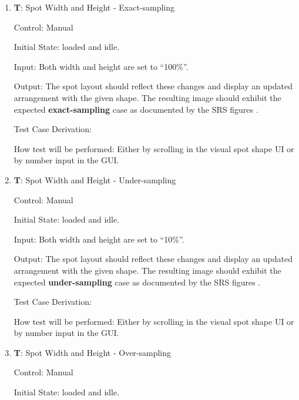 \documentclass[12pt, titlepage]{article}
\newcounter{testnum} %
\begin{document}
\begin{enumerate}

  \item{\textbf{T\thetestnum \label{T_spotSize}}: Spot Width and Height - Exact-sampling\\}

    Control: Manual
              
    Initial State: \progname{} loaded and idle.
              
    Input: Both width and height are set to ``100\%''.
              
    Output: The spot layout should reflect these changes and display an updated arrangement with the given shape.
    The resulting image should exhibit the expected \textbf{exact-sampling} case as documented by the SRS figures \citep{SRS}.

    Test Case Derivation: 
              
    How test will be performed: Either by scrolling in the visual spot shape UI or by number input in the GUI.
					
    \item{\textbf{T\thetestnum \label{T_spotSize10}}: Spot Width and Height - Under-sampling\\}

    Control: Manual
              
    Initial State: \progname{} loaded and idle.
              
    Input: Both width and height are set to ``10\%''.
              
    Output: The spot layout should reflect these changes and display an updated arrangement with the given shape.
    The resulting image should exhibit the expected \textbf{under-sampling} case as documented by the SRS figures \citep{SRS}.

    Test Case Derivation: 
              
    How test will be performed: Either by scrolling in the visual spot shape UI or by number input in the GUI.
					
    \item{\textbf{T\thetestnum \label{T_spotSize500}}: Spot Width and Height - Over-sampling\\}

    Control: Manual
              
    Initial State: \progname{} loaded and idle.
              

\end{enumerate}
\end{document}
